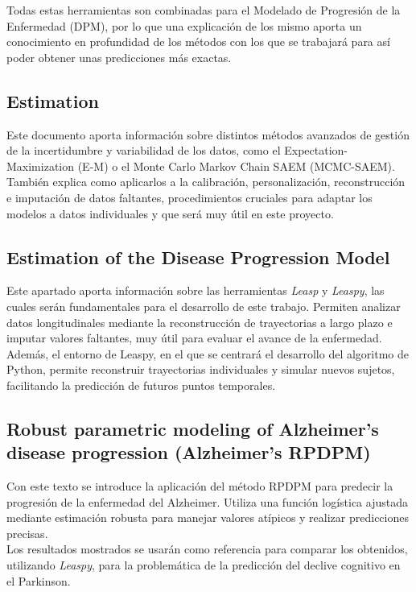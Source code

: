 Todas estas herramientas son combinadas para el Modelado de Progresión de la Enfermedad (DPM), por lo que una explicación de los mismo aporta un conocimiento en profundidad de los métodos con los que se trabajará para así poder obtener unas predicciones más exactas.

\subsection{Estimation}
Este documento aporta información sobre distintos métodos avanzados de gestión de la incertidumbre y variabilidad de los datos, como el Expectation-Maximization (E-M) o el Monte Carlo Markov Chain SAEM (MCMC-SAEM).\\

También explica como aplicarlos a la calibración, personalización, reconstrucción e imputación de datos faltantes, procedimientos cruciales para adaptar los modelos a datos individuales y que será muy útil en este proyecto.

\subsection{Estimation of the Disease Progression Model}
Este apartado aporta información sobre las herramientas \textit{Leasp} y \textit{Leaspy}, las cuales serán fundamentales para el desarrollo de este trabajo. Permiten analizar datos longitudinales mediante la reconstrucción de trayectorias a largo plazo e imputar valores faltantes, muy útil para evaluar el avance de la enfermedad.\\

Además, el entorno de Leaspy, en el que se centrará el desarrollo del algoritmo de Python, permite reconstruir trayectorias individuales y simular nuevos sujetos, facilitando la predicción de futuros puntos temporales.

\subsection{Robust parametric modeling of Alzheimer's disease progression (Alzheimer's RPDPM)}
Con este texto se introduce la aplicación del método RPDPM para predecir la progresión de la enfermedad del Alzheimer. Utiliza una función logística ajustada mediante estimación robusta para manejar valores atípicos y realizar predicciones precisas. \\

Los resultados mostrados se usarán como referencia para comparar los obtenidos, utilizando \textit{Leaspy}, para la problemática de la predicción del declive cognitivo en el Parkinson.


